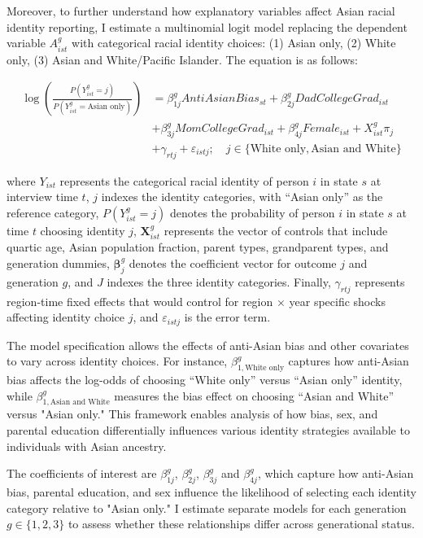 Moreover, to further understand how explanatory variables affect Asian racial identity reporting, I estimate a multinomial logit model replacing the dependent variable $A_{ist}^g$ with categorical racial identity choices: (1) Asian only, (2) White only, (3) Asian and White/Pacific Islander. The equation is as follows:

\begin{align}
\log\left(\frac{P(Y_{ist}^g = j)}{P(Y_{ist}^g = \text{Asian only})}\right) &= \beta_{1j}^g AntiAsianBias_{st} + \beta_{2j}^g DadCollegeGrad_{ist}\nonumber \\ 
& + \beta_{3j}^g MomCollegeGrad_{ist} + \beta_{4j}^g Female_{ist} + X_{ist}^g\pi_j  \nonumber \\ 
& + \gamma_{rtj} + \varepsilon_{istj}; \quad j \in \{\text{White only}, \text{Asian and White}\} \label{eq:multinomial_logit}
\end{align}

where $Y_{ist}$ represents the categorical racial identity of person $i$ in state $s$ at interview time $t$, $j$ indexes the identity categories, with ``Asian only'' as the reference category, $P(Y_{ist}^g = j)$ denotes the probability of person $i$ in state $s$ at time $t$ choosing identity $j$, $\mathbf{X}_{ist}^g$ represents the vector of controls that include quartic age, Asian population fraction, parent types, grandparent types, and generation dummies, $\boldsymbol{\beta}_j^g$ denotes the coefficient vector for outcome $j$ and generation $g$, and $J$ indexes the three identity categories. Finally, $\gamma_{rtj}$ represents region-time fixed effects that would control for region $\times$ year specific shocks affecting identity choice $j$, and $\varepsilon_{istj}$ is the error term.

The model specification allows the effects of anti-Asian bias and other covariates to vary across identity choices. For instance, $\beta_{1,\text{White only}}^g$ captures how anti-Asian bias affects the log-odds of choosing ``White only'' versus ``Asian only'' identity, while $\beta_{1,\text{Asian and White}}^g$ measures the bias effect on choosing ``Asian and White'' versus "Asian only." This framework enables analysis of how bias, sex, and parental education differentially influences various identity strategies available to individuals with Asian ancestry.

The coefficients of interest are $\beta_{1j}^g$, $\beta_{2j}^g$, $\beta_{3j}^g$ and $\beta_{4j}^g$, which capture how anti-Asian bias, parental education, and sex influence the likelihood of selecting each identity category relative to "Asian only." I estimate separate models for each generation $g \in \{1,2,3\}$ to assess whether these relationships differ across generational status.

